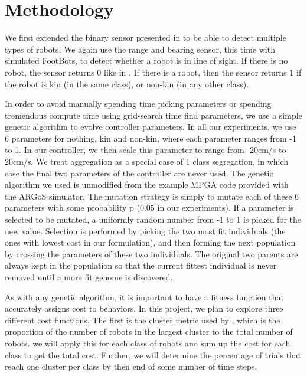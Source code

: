 \documentclass[conference]{IEEEtran}
\begin{document}
\section{Methodology}

  We first extended the binary sensor presented in \cite{gauci_self-organized_2014} to be able to detect multiple types of robots. We again use the range and bearing sensor, this time with simulated FootBots, to detect whether a robot is in line of sight. If there is no robot, the sensor returns 0 like in \cite{gauci_self-organized_2014}. If there is a robot, then the sensor returns 1 if the robot is kin (in the same class), or non-kin (in any other class).
  
  In order to avoid manually spending time picking parameters or spending tremendous compute time using grid-search time find parameters, we use a simple genetic algorithm to evolve controller parameters. In all our experiments, we use 6 parameters for nothing, kin and non-kin, where each parameter ranges from -1 to 1. In our controller, we then scale this parameter to range from -20cm/s to 20cm/s. We treat aggregation as a special case of 1 class segregation, in which case the final two parameters of the controller are never used. The genetic algorithm we used is unmodified from the example MPGA code provided with the ARGoS simulator. The mutation strategy is simply to mutate each of these 6 parameters with some probability p ($0.05$ in our experiments). If a parameter is selected to be mutated, a uniformly random number from -1 to 1 is picked for the new value. Selection is performed by picking the two most fit individuals (the ones with lowest cost in our formulation), and then forming the next population by crossing the parameters of these two individuals. The original two parents are always kept in the population so that the current fittest individual is never removed until a more fit genome is discovered.

  As with any genetic algorithm, it is important to have a fitness function that accurately assigns cost to behaviors. In this project, we plan to explore three different cost functions. The first is the cluster metric used by \cite{gauci_self-organized_2014}, which is the proportion of the number of robots in the largest cluster to the total number of robots. we will apply this for each class of robots and sum up the cost for each class to get the total cost. Further, we will determine the percentage of trials that reach one cluster per class by then end of some number of time steps.
\end{document}
